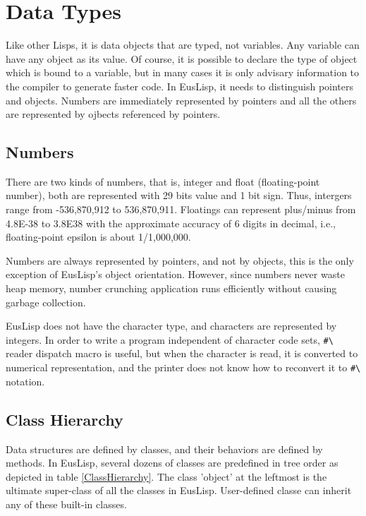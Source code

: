 
\section{Data Types}
Like other Lisps, it is data objects that are typed, not variables.
Any variable can have any object as its value.
Of course, it is possible to
declare the type of object which is bound to a variable, but in many cases
it is only advisary information to the compiler to generate faster code.
In EusLisp, it needs to distinguish pointers and objects.
Numbers are immediately represented by pointers and all the others
are represented by ojbects referenced by pointers.
 
\subsection{Numbers}

There are two kinds of numbers, that is, 
integer and float (floating-point number), both are represented
with 29 bits value and 1 bit sign.
Thus, intergers range from -536,870,912 to 536,870,911.
Floatings can represent plus/minus from 4.8E-38 to 3.8E38 with the
approximate accuracy of 6 digits in decimal, i.e.,
floating-point epsilon is about 1/1,000,000.

Numbers are always represented by pointers, and not by objects,
this is the only exception of EusLisp's object orientation.
However, since numbers never waste heap memory, number crunching application
runs efficiently without causing garbage collection.

EusLisp does not have the character type,
and characters are represented by integers.
In order to write a program independent of character code sets,
\verb+#\+ reader dispatch macro is useful, but when the character is read,
it is converted to numerical representation, and the printer does not
know how to reconvert it to
\verb+#\+ notation.

\subsection{Class Hierarchy}

Data structures are defined by classes, and their behaviors are defined by
methods.
In EusLisp, several dozens of classes are predefined in tree order
as depicted in table \ref{ClassHierarchy}.
The class 'object' at the leftmost is the ultimate super-class of
all the classes in EusLisp.
User-defined classe can inherit any of these built-in classes.

